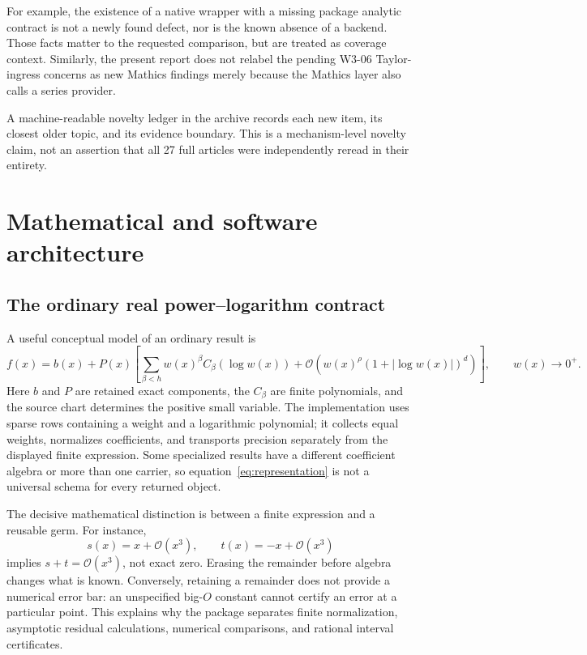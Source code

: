 \documentclass[11pt,letterpaper]{article}
\newcommand{\code}[1]{\texttt{\detokenize{#1}}}
\newcommand{\OO}{\mathcal O}
\begin{document}
For example, the existence of a native wrapper with a missing package analytic contract is not a newly found defect, nor is the known absence of a \code{DiscreteAsymptotic} backend. Those facts matter to the requested comparison, but are treated as coverage context. Similarly, the present report does not relabel the pending W3-06 Taylor-ingress concerns as new Mathics findings merely because the Mathics layer also calls a series provider.

A machine-readable novelty ledger in the archive records each new item, its closest older topic, and its evidence boundary. This is a mechanism-level novelty claim, not an assertion that all 27 full articles were independently reread in their entirety.

\section{Mathematical and software architecture}
\label{sec:architecture}

\subsection{The ordinary real power--logarithm contract}

A useful conceptual model of an ordinary result is
\begin{equation}
 f(x)=b(x)+P(x)\left[\sum_{\beta<h}w(x)^\beta C_\beta(\log w(x))
 +\OO\!\left(w(x)^\rho(1+|\log w(x)|)^d\right)\right],
 \qquad w(x)\longrightarrow0^+.
 \label{eq:representation}
\end{equation}
Here $b$ and $P$ are retained exact components, the $C_\beta$ are finite polynomials, and the source chart determines the positive small variable. The implementation uses sparse rows containing a weight and a logarithmic polynomial; it collects equal weights, normalizes coefficients, and transports precision separately from the displayed finite expression. Some specialized results have a different coefficient algebra or more than one carrier, so equation~\eqref{eq:representation} is not a universal schema for every returned object.~\cite{core,operations}

The decisive mathematical distinction is between a finite expression and a reusable germ. For instance,
\[
 s(x)=x+\OO(x^3),\qquad t(x)=-x+\OO(x^3)
\]
implies $s+t=\OO(x^3)$, not exact zero. Erasing the remainder before algebra changes what is known. Conversely, retaining a remainder does not provide a numerical error bar: an unspecified big-$O$ constant cannot certify an error at a particular point. This explains why the package separates finite normalization, asymptotic residual calculations, numerical comparisons, and rational interval certificates.~\cite{readme,core}
\end{document}

